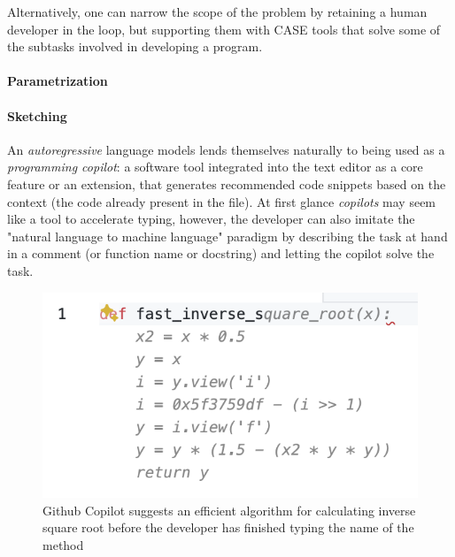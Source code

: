 Alternatively, one can narrow the scope of the problem by retaining a human developer in the loop, but supporting them with CASE \cite{caseComputeraidedSoftwareEngineering1985} tools that solve some of the subtasks involved in developing a program.

\paragraph{Parametrization}



\paragraph{Sketching}


An \emph{autoregressive} language models lends themselves naturally to being used as a \emph{programming copilot}: a software tool integrated into the text editor as a core feature or an extension, that generates recommended code snippets based on the context (the code already present in the file).
At first glance \emph{copilots} may seem like a tool to accelerate typing, however, the developer can also imitate the "natural language to machine language" paradigm by describing the task at hand in a comment (or function name or docstring) and letting the copilot solve the task.


\begin{figure}[H]
    \centering
    \includegraphics{images/fastinversesqrt.png}
    \caption{Github Copilot \cite{dakhelGithubCopilotAi2023, nguyenEmpiricalEvaluationGitHub2022, wermelingerUsingGithubCopilot2023} suggests an efficient algorithm for calculating inverse square root \cite{lomontFastInverseSquare2003} before the developer has finished typing the name of the method}
    \label{fig:fastinversesqrt}
\end{figure}

